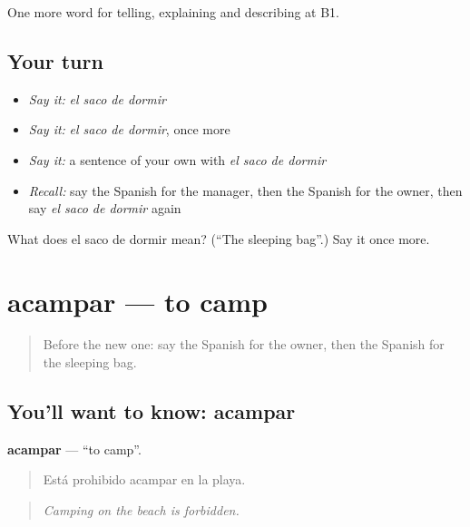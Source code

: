 \begin{grammarlens}[title={What you've built}]
One more word for telling, explaining and describing at B1.
\end{grammarlens}

\subsection*{Your turn}
\begin{itemize}
\raggedright
  \item \emph{Say it:} \emph{el saco de dormir}
  \item \emph{Say it:} \emph{el saco de dormir}, once more
  \item \emph{Say it:} a sentence of your own with \emph{el saco de dormir}
  \item \emph{Recall:} say the Spanish for the manager, then the Spanish for the owner, then say \emph{el saco de dormir} again
\end{itemize}

\begin{tcolorbox}[breakable,colback=teal!4,colframe=teal!35!black,title={Before you move on}]
What does el saco de dormir mean? (\textquotedblleft{}The sleeping bag\textquotedblright{}.) Say it once more.
\end{tcolorbox}
\section[acampar]{acampar — to camp}

\label{lesson:ES-C666-acampar}



\begin{quote}
Before the new one: say the Spanish for the owner, then the Spanish for the sleeping bag.
\end{quote}

\subsection*{You'll want to know: acampar}
\textbf{acampar} — \textquotedblleft{}to camp\textquotedblright{}.

\begin{quote}
Está prohibido acampar en la playa.
\end{quote}

\begin{quote}
\emph{Camping on the beach is forbidden.}
\end{quote}

